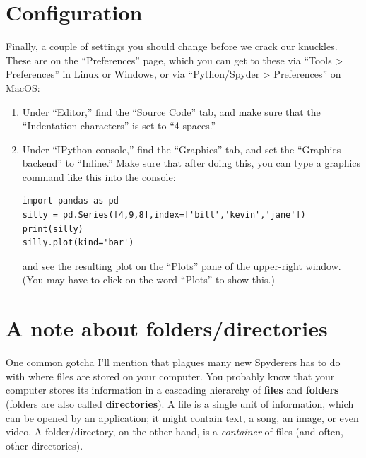 \section{Configuration}

Finally, a couple of settings you should change before we crack our knuckles.
These are on the ``Preferences'' page, which you can get to these via ``Tools >
Preferences'' in Linux or Windows, or via ``Python/Spyder > Preferences'' on
MacOS:

\begin{enumerate}
\itemsep.1em

\item Under ``Editor,'' find the ``Source Code'' tab, and make sure that the
``Indentation characters'' is set to ``4 spaces.''

\item Under ``IPython console,'' find the ``Graphics'' tab, and set the
``Graphics backend'' to ``Inline.'' Make sure that after doing this, you can
type a graphics command like this into the console:

\begin{Verbatim}[fontsize=\footnotesize,samepage=true,frame=single,framesep=3mm]
import pandas as pd
silly = pd.Series([4,9,8],index=['bill','kevin','jane'])
print(silly)
silly.plot(kind='bar')
\end{Verbatim}

and see the resulting plot on the ``Plots'' pane of the upper-right window.
(You may have to click on the word ``Plots'' to show this.)

\end{enumerate}

\section{A note about folders/directories}


One common gotcha I'll mention that plagues many new Spyderers has to do with
where files are stored on your computer. You probably know that your computer
stores its information in a cascading hierarchy of \textbf{files} and
\textbf{folders} (folders are also called \textbf{directories}). A file is a
single unit of information, which can be opened by an application; it might
contain text, a song, an image, or even video. A folder/directory, on the other
hand, is a \textit{container} of files (and often, other directories).

